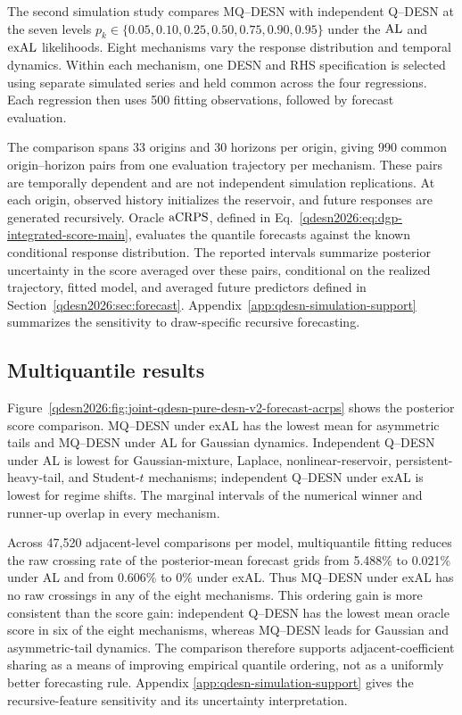 The second simulation study compares MQ--DESN with independent Q--DESN at the
seven levels
\(p_k\in\{0.05,0.10,0.25,0.50,0.75,0.90,0.95\}\)
under the \(\operatorname{AL}\) and \(\operatorname{exAL}\) likelihoods. Eight mechanisms vary the
response distribution and temporal dynamics. Within each mechanism, one
DESN and RHS specification is selected using separate simulated series and
held common across the four regressions. Each regression then uses 500
fitting observations, followed by forecast evaluation.

The comparison spans 33 origins and 30 horizons per origin, giving 990 common
origin--horizon pairs from one evaluation trajectory per mechanism. These
pairs are temporally dependent and are not independent simulation replications.
At each origin, observed history initializes the
reservoir, and future responses are generated recursively. Oracle
\(\operatorname{aCRPS}\), defined in Eq.~\eqref{qdesn2026:eq:dgp-integrated-score-main}, evaluates
the quantile forecasts against the known conditional response distribution.
The reported intervals summarize posterior uncertainty in the score averaged
over these pairs, conditional on the realized trajectory, fitted model, and
averaged future predictors defined in
Section~\ref{qdesn2026:sec:forecast}. Appendix~\ref{app:qdesn-simulation-support}
summarizes the sensitivity to draw-specific recursive forecasting.

\subsection{Multiquantile results}

Figure~\ref{qdesn2026:fig:joint-qdesn-pure-desn-v2-forecast-acrps} shows the posterior
score comparison. MQ--DESN under exAL has the lowest mean for asymmetric
tails and MQ--DESN under AL for Gaussian dynamics. Independent Q--DESN
under AL is lowest for
Gaussian-mixture, Laplace, nonlinear-reservoir, persistent-heavy-tail, and
Student-\(t\) mechanisms; independent Q--DESN under exAL is lowest for regime shifts.
The marginal intervals of the numerical winner and runner-up overlap in
every mechanism.



Across 47,520 adjacent-level comparisons per model, multiquantile fitting
reduces the raw crossing rate of the posterior-mean forecast grids from
5.488\% to 0.021\% under AL and from 0.606\% to 0\% under exAL. Thus MQ--DESN
under exAL has no raw crossings in any of the eight mechanisms. This ordering
gain is more consistent than the score gain: independent Q--DESN has the
lowest mean oracle score in six of the eight mechanisms, whereas MQ--DESN
leads for Gaussian and asymmetric-tail dynamics. The comparison therefore
supports adjacent-coefficient sharing as a means of improving empirical
quantile ordering, not as a uniformly better forecasting rule. Appendix
\ref{app:qdesn-simulation-support} gives the recursive-feature sensitivity and
its uncertainty interpretation.

